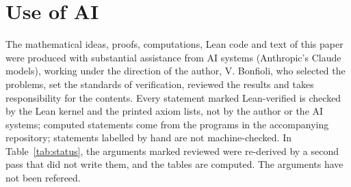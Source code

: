 \documentclass[11pt]{article}
\theoremstyle{definition}
\theoremstyle{remark}
\begin{document}
\section*{Use of AI}
The mathematical ideas, proofs, computations, Lean code and text of this paper were produced with substantial assistance from AI systems (Anthropic's Claude models), working under the direction of the author, V. Bonfioli, who selected the problems, set the standards of verification, reviewed the results and takes responsibility for the contents. Every statement marked Lean-verified is checked by the Lean kernel and the printed axiom lists, not by the author or the AI systems; computed statements come from the programs in the accompanying repository; statements labelled by hand are not machine-checked. In Table~\ref{tab:status}, the arguments marked reviewed were re-derived by a second pass that did not write them, and the tables are computed. The arguments have not been refereed.
\end{document}
